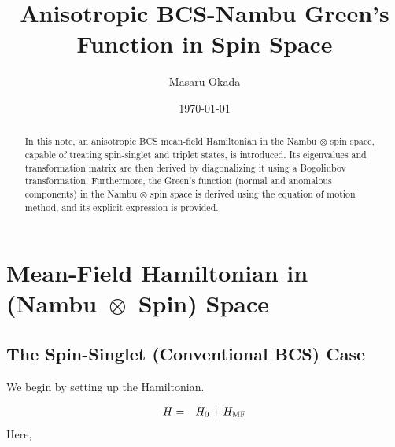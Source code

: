 \documentclass[uplatex,a4j,12pt,dvipdfmx]{jsarticle}
\title{
Anisotropic BCS-Nambu Green's Function in Spin Space
}
\author{Masaru Okada}
\date{\today}
\begin{document}
\maketitle

\begin{abstract}
	In this note, an anisotropic BCS mean-field Hamiltonian in the Nambu $\otimes$ spin space, capable of treating spin-singlet and triplet states, is introduced. Its eigenvalues and transformation matrix are then derived by diagonalizing it using a Bogoliubov transformation. Furthermore, the Green's function (normal and anomalous components) in the Nambu $\otimes$ spin space is derived using the equation of motion method, and its explicit expression is provided.
\end{abstract}

\tableofcontents

\section{Mean-Field Hamiltonian in (Nambu $\!\! \otimes \!\!$ Spin) Space}

\subsection{The Spin-Singlet (Conventional BCS) Case}

We begin by setting up the Hamiltonian.

\begin{eqnarray}
	H
	&=&
	H_{0}
	+
	H_{\rm MF}
\end{eqnarray}
%
Here,
\end{document}
